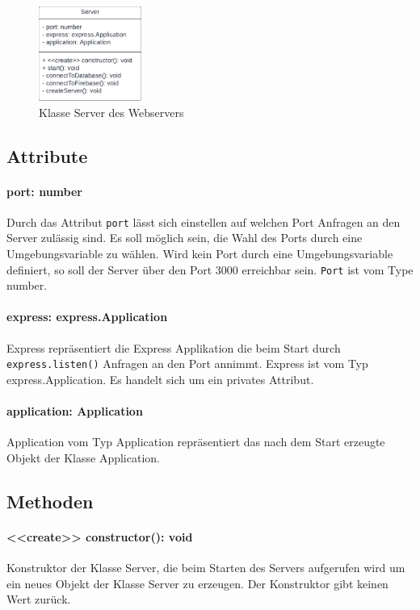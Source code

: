 \documentclass[parskip=full]{scrartcl}
\begin{document}
\begin{figure}[htp]
    \centering
    \includegraphics[width = 0.3\textwidth]{images/webserver/server.pdf}
    \caption{Klasse Server des Webservers}
    \label{fig:server}
\end{figure}

\subsection*{Attribute}
\paragraph{port: number}Durch das Attribut \texttt{port} lässt sich einstellen auf welchen Port Anfragen an den Server zulässig sind. Es soll möglich sein, die Wahl des Ports durch eine Umgebungsvariable zu wählen. Wird kein Port durch eine Umgebungsvariable definiert, so soll der Server über den Port 3000 erreichbar sein.
\texttt{Port} ist vom Type number.
\paragraph{express: express.Application}Express repräsentiert die Express Applikation die beim Start durch \texttt{express.listen()} Anfragen an den Port annimmt.
Express ist vom Typ express.Application. Es handelt sich um ein privates Attribut.
\paragraph{application: Application}Application vom Typ Application repräsentiert das nach dem Start erzeugte Objekt der Klasse Application.

\subsection*{Methoden}
\paragraph{<<create>> constructor(): void}Konstruktor der Klasse Server, die beim Starten des Servers aufgerufen wird um ein neues Objekt der Klasse Server zu erzeugen. Der Konstruktor gibt keinen Wert zurück.
\end{document}
